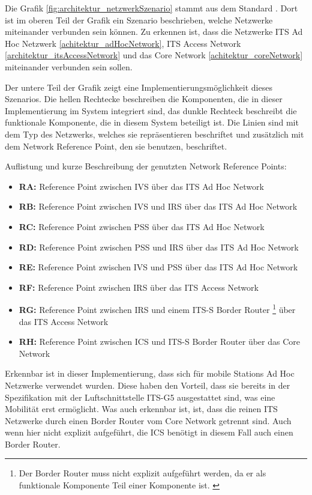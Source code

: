 Die Grafik \ref{fig:architektur_netzwerkSzenario} stammt aus dem Standard \cite{etsi302636-3}. Dort ist im oberen Teil der Grafik ein Szenario beschrieben, welche Netzwerke miteinander verbunden sein können.  Zu erkennen ist, dass die Netzwerke ITS Ad Hoc Netzwerk \ref{achitektur_adHocNetwork}, ITS Access Network \ref{architektur_itsAccessNetwork} und das Core Network  \ref{achitektur_coreNetwork} miteinander verbunden sein sollen.

Der untere Teil der Grafik zeigt eine Implementierungsmöglichkeit dieses Szenarios. Die hellen Rechtecke beschreiben die Komponenten, die in dieser Implementierung im System integriert sind, das dunkle Rechteck beschreibt die funktionale Komponente, die in diesem System beteiligt ist. Die Linien sind mit dem Typ des Netzwerks, welches sie repräsentieren beschriftet und zusätzlich mit dem Network Reference Point, den sie benutzen, beschriftet.

Auflistung und kurze Beschreibung der genutzten Network Reference Points:
\begin{itemize}
	\item \textbf{RA: } Reference Point zwischen \ac{IVS} über das ITS Ad Hoc Network
	\item \textbf{RB: } Reference Point zwischen \ac{IVS} und \ac{IRS} über das ITS Ad Hoc Network
	\item \textbf{RC: } Reference Point zwischen \ac{PSS} über das ITS Ad Hoc Network
	\item \textbf{RD: } Reference Point zwischen \ac{PSS} und \ac{IRS} über das ITS Ad Hoc Network
	\item \textbf{RE: } Reference Point zwischen \ac{IVS} und \ac{PSS} über das ITS Ad Hoc Network
	\item \textbf{RF: } Reference Point zwischen \ac{IRS} über das ITS Access Network
	\item \textbf{RG: } Reference Point zwischen \ac{IRS} und einem ITS-S Border Router \footnote{Der Border Router muss nicht explizit aufgeführt werden, da er als funktionale Komponente Teil einer Komponente ist. \label{ftn:borderRouter}} über das ITS Access Network 
	\item \textbf{RH: } Reference Point zwischen \ac{ICS} und ITS-S Border Router  über das Core Network		
\end{itemize}

Erkennbar ist in dieser Implementierung, dass sich für mobile Stations Ad Hoc Netzwerke verwendet wurden. Diese haben den Vorteil, dass sie bereits in der Spezifikation mit der Luftschnittstelle ITS-G5 ausgestattet sind, was eine Mobilität erst ermöglicht. Was auch erkennbar ist, ist, dass die reinen ITS Netzwerke durch einen Border Router vom Core Network getrennt sind. Auch wenn hier nicht explizit aufgeführt, die \ac{ICS} benötigt in diesem Fall auch einen Border Router.

